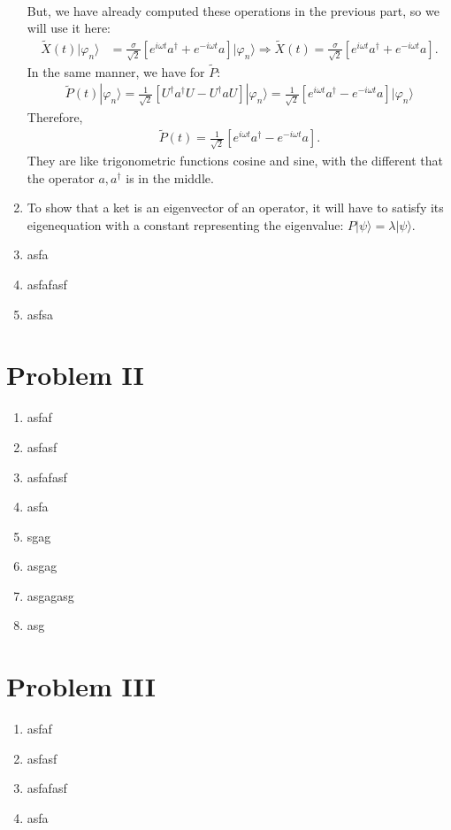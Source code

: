 \documentclass[letterpaper,11pt,twoside]{article}
\newcommand{\ket}[1]{|#1\rangle}
\begin{document}
\begin{enumerate}[itemsep=0pt,topsep=0pt,label=\alph*)]
\begin{align*}
  \end{align*}
  But, we have already computed these operations in the previous part, so we will use it here:
  \begin{align*}
    \tilde{X}(t)\ket{\varphi_n}&=\frac{\sigma}{\sqrt{2}}\left[e^{i\omega t}a^\dagger+e^{-i\omega t}a\right]\ket{\varphi_n}\Longrightarrow \tilde{X}(t)=\frac{\sigma}{\sqrt{2}}\left[e^{i\omega t}a^\dagger+e^{-i\omega t}a\right].
  \end{align*}
  In the same manner, we have for $\tilde{P}$:
  \begin{align*}
    \tilde{P}(t)\ket{\varphi_n}=\frac{1}{\sqrt{2}}\left[U^\dagger a^\dagger U-U^\dagger aU\right]\ket{\varphi_n}=\frac{1}{\sqrt{2}}\left[e^{i\omega t}a^\dagger-e^{-i\omega t}a\right]\ket{\varphi_n}
  \end{align*}
  Therefore,
  \begin{align*}
    \tilde{P}(t)=\frac{1}{\sqrt{2}}\left[e^{i\omega t}a^\dagger-e^{-i\omega t}a\right].
  \end{align*}
  They are like trigonometric functions cosine and sine, with the different that the operator $a,a^\dagger$ is in the middle.
  \item To show that a ket is an eigenvector of an operator, it will have to satisfy its eigenequation with a constant representing the eigenvalue: $P\ket{\psi}=\lambda\ket{\psi}$.
  \item asfa
  \item asfafasf
  \item asfsa
\end{enumerate}


\section*{Problem II}
\begin{enumerate}[itemsep=0pt,topsep=0pt,label=\alph*)]
  \item asfaf
  \item asfasf
  \item asfafasf
  \item asfa
  \item sgag
  \item asgag
  \item asgagasg
  \item asg
\end{enumerate}


\section*{Problem III}
\begin{enumerate}[itemsep=0pt,topsep=0pt,label=\alph*)]
  \item asfaf
  \item asfasf
  \item asfafasf
  \item asfa
\end{enumerate}
\end{document}
